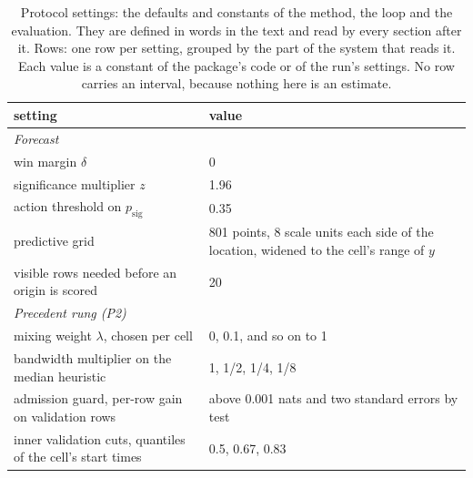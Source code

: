 \documentclass[sigconf,nonacm]{acmart}
\newcommand{\psig}{p_{\mathrm{sig}}}
\begin{document}
\begin{table}[t]\centering\scriptsize
\caption{Protocol settings: the defaults and constants of the method, the loop and the evaluation. They are defined in words in the text and read by every section after it. Rows: one row per setting, grouped by the part of the system that reads it. Each value is a constant of the package's code or of the run's settings. No row carries an interval, because nothing here is an estimate.}
\label{tab:fmt-protocol}
\begin{tabular}{p{}p{}}
\toprule
setting & value \\
\midrule
\multicolumn{2}{l}{\emph{Forecast}} \\
win margin $\delta$ & 0 \\
significance multiplier $z$ & 1.96 \\
action threshold on $\psig$ & 0.35 \\
predictive grid & 801 points, 8 scale units each side of the location, widened to the cell's range of $y$ \\
visible rows needed before an origin is scored & 20 \\
\midrule
\multicolumn{2}{l}{\emph{Precedent rung (P2)}} \\
mixing weight $\lambda$, chosen per cell & 0, 0.1, and so on to 1 \\
bandwidth multiplier on the median heuristic & 1, 1/2, 1/4, 1/8 \\
admission guard, per-row gain on validation rows & above 0.001 nats and two standard errors by test \\
inner validation cuts, quantiles of the cell's start times & 0.5, 0.67, 0.83 \\

\end{tabular}
\end{table}
\end{document}
